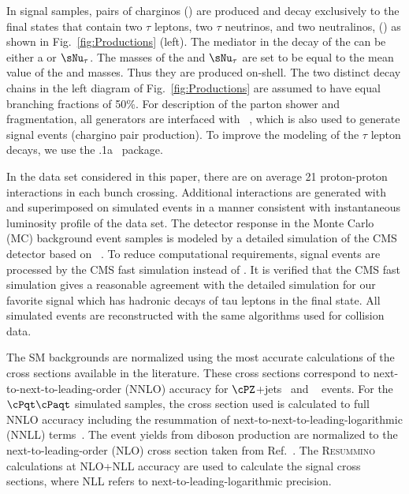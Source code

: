 In signal samples, pairs of charginos (\chione) 
are produced and decay exclusively to the final states that contain two $\tau$ leptons, two $\tau$ neutrinos, and %
two neutralinos, (\PSGczDo) as shown in Fig.~\ref{fig:Productions} (left). 
The mediator in the decay of the \chione can be either a \sTau or $\sNu_{\tau}$. 
The masses of the \sTau and $\sNu_{\tau}$ are set to be equal to the mean value of the \chione and \PSGczDo masses. 
Thus they are produced on-shell.
The two distinct decay chains in the left diagram of Fig.~\ref{fig:Productions} 
are assumed to have equal branching fractions of 50\%. 
For description of the parton shower and fragmentation, all generators are interfaced with ~\cite{Sjostrand:2006za}, 
which is also used to generate signal events (chargino pair production). To improve the modeling of the $\tau$ lepton decays, 
we use the .1a~\cite{Davidson:2010rw} package. 


In the data set considered in this paper,
there are on average 21 proton-proton interactions in each bunch crossing.
Additional interactions are generated with \PYTHIA and superimposed on simulated events in a manner consistent with 
 instantaneous luminosity profile of the data set.
The detector response in the  Monte Carlo (MC) background event samples is modeled by a
detailed simulation
of the CMS detector based on {\GEANTfour}~\cite{Agostinelli:2002hh}.  
To reduce  computational requirements, signal events 
are processed by the CMS fast simulation \cite{Abdullin:2011zz} instead of {\GEANTfour}. 
It is verified that the CMS fast simulation gives a reasonable agreement with the detailed simulation for our favorite signal which has hadronic decays of 
tau leptons in the final state.
All simulated events are reconstructed with the same algorithms used for collision data.

The SM backgrounds are normalized using the most accurate calculations of the cross sections available 
in the literature. These cross sections correspond to next-to-next-to-leading-order (NNLO) accuracy for $\cPZ$+jets~\cite{Melnikov:2006kv} 
and \wjets~\cite{xsec_WZ} events. For the $\cPqt\cPaqt$ simulated samples, the cross section used is calculated to full NNLO accuracy including
the resummation of next-to-next-to-leading-logarithmic (NNLL) terms~\cite{Czakon:2011xx}. %
The event yields from diboson production are normalized to the next-to-leading-order (NLO) cross section  taken from Ref.~\cite{Campbell:2011bn}. 
The \textsc{Resummino}~\cite{Fuks:2012qx,Fuks:2013vua,Fuks:2013lya} calculations at NLO+NLL accuracy are used to calculate the signal cross sections, where 
NLL refers to next-to-leading-logarithmic precision.
